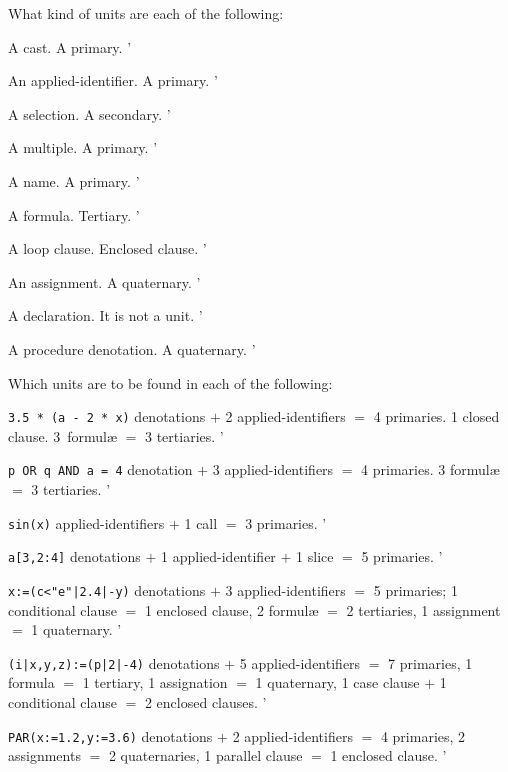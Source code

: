 \begin{exercise}
\item What kind of units are each of the following:
\begin{subex}
\item A cast. \subans A primary.
'
\item An applied-identifier. \subans A primary.
'
\item A selection. \subans A secondary.
'
\item A multiple. \subans A primary.
'
\item A name. \subans A primary.
'
\item A formula. \subans Tertiary.
'
\item A loop clause. \subans Enclosed clause.
'
\item An assignment. \subans A quaternary.
'
\item A declaration. \subans It is not a unit.
'
\item A procedure denotation. \subans A quaternary.
'
\end{subex}
\item Which units are to be found in each of the following:
\begin{subex}
\item \verb|3.5 * (a - 2 * x)|  denotations $+$ 2
applied-identifiers $=$ 4 primaries. 1 closed clause. 3~formul\ae{}
$=$ 3 tertiaries.
'
\item \verb|p OR q AND a = 4|  denotation $+$ 3
applied-identifiers $=$ 4 primaries. 3 formul\ae{} $=$ 3 tertiaries.
'
\item \verb|sin(x)|  applied-identifiers $+$ 1 call $=$ 3
primaries.
'
\item \verb|a[3,2:4]|  denotations $+$ 1 applied-identifier
$+$ 1 slice $=$ 5 primaries.
'
\item \verb!x:=(c<"e"|2.4|-y)!  denotations $+$ 3
applied-identifiers $=$ 5 primaries; 1 conditional clause $=$ 1
enclosed clause, 2 formul\ae{} $=$ 2 tertiaries, 1 assignment $=$ 1
quaternary.
'
\item \verb!(i|x,y,z):=(p|2|-4)!  denotations $+$ 5
applied-identifiers $=$ 7 primaries, 1 formula $=$ 1 tertiary, 1
assignation $=$ 1 quaternary, 1 case clause $+$ 1 conditional clause
$=$ 2 enclosed clauses.
'
\item \verb|PAR(x:=1.2,y:=3.6)|  denotations $+$ 2
applied-identifiers $=$ 4 primaries, 2 assignments $=$ 2
quaternaries, 1 parallel clause $=$ 1 enclosed clause.
'
\end{subex}
\end{exercise}

